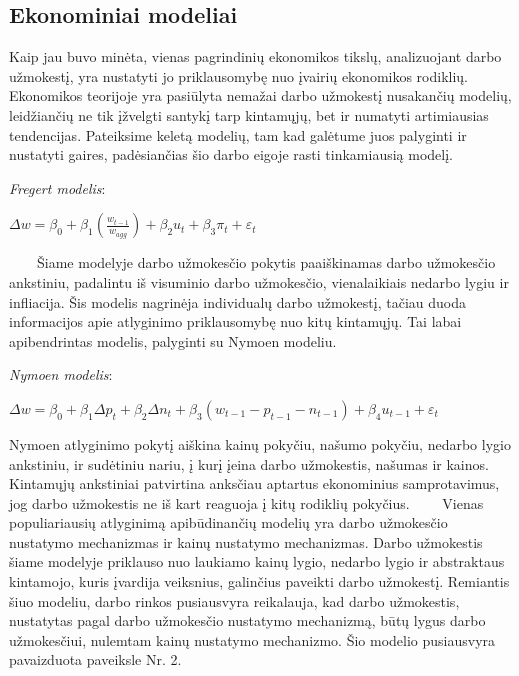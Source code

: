 \documentclass[12pt,a4paper]{article}
\theoremstyle{change}\newtheorem{salyga}{Uždavinys}
\begin{document}
\subsection{Ekonominiai modeliai}
\medskip
\hspace{40pt} Kaip jau buvo minėta, vienas pagrindinių ekonomikos tikslų, analizuojant darbo užmokestį, yra nustatyti jo priklausomybę nuo įvairių ekonomikos rodiklių. Ekonomikos teorijoje yra pasiūlyta nemažai darbo užmokestį nusakančių modelių, leidžiančių ne tik įžvelgti santykį tarp kintamųjų, bet ir numatyti artimiausias tendencijas. Pateiksime keletą modelių, tam kad galėtume juos palyginti ir nustatyti gaires, padėsiančias šio darbo eigoje rasti tinkamiausią modelį.
\vskip 8pt

\small { \textit{Fregert modelis}:}
\begin{center}
\large $ \Delta w=\beta_0+\beta_1(\frac{w_{t-1}}{w_{agg}})+\beta_2u_t+\beta_3\pi_t+\varepsilon_t $
\end{center}
\vskip 8pt
$\qquad $Šiame modelyje darbo užmokesčio pokytis paaiškinamas darbo užmokesčio ankstiniu, padalintu iš visuminio darbo užmokesčio, vienalaikiais nedarbo lygiu ir infliacija. Šis modelis nagrinėja individualų darbo užmokestį, tačiau duoda informacijos apie atlyginimo priklausomybę nuo kitų kintamųjų. Tai labai apibendrintas modelis, palyginti su Nymoen modeliu.
\vskip 8pt

\small { \textit{Nymoen modelis}:}
\begin{center}
\large $ \Delta w=\beta_0+\beta_1\Delta p_t+\beta_2\Delta n_t+\beta_3(w_{t-1}-p_{t-1}-n_{t-1})+\beta_4 u_{t-1}+\varepsilon_t$
\end{center}
\vskip 8pt
\hspace{40pt}Nymoen atlyginimo pokytį aiškina kainų pokyčiu, našumo pokyčiu, nedarbo lygio ankstiniu, ir sudėtiniu nariu, į kurį įeina darbo užmokestis, našumas ir kainos. Kintamųjų ankstiniai patvirtina anksčiau aptartus ekonominius samprotavimus, jog darbo užmokestis ne iš kart reaguoja į kitų rodiklių pokyčius. 
\vskip 8pt
$\qquad $Vienas populiariausių atlyginimą apibūdinančių modelių yra darbo užmokesčio nustatymo mechanizmas ir kainų nustatymo mechanizmas. Darbo užmokestis šiame modelyje priklauso nuo laukiamo kainų lygio, nedarbo lygio ir abstraktaus kintamojo, kuris įvardija veiksnius, galinčius paveikti darbo užmokestį. Remiantis šiuo modeliu, darbo rinkos pusiausvyra reikalauja, kad darbo užmokestis, nustatytas pagal darbo užmokesčio nustatymo mechanizmą, būtų lygus darbo užmokesčiui, nulemtam kainų nustatymo mechanizmo. Šio modelio pusiausvyra pavaizduota paveiksle Nr. 2.
\vskip 8pt
\end{document}
